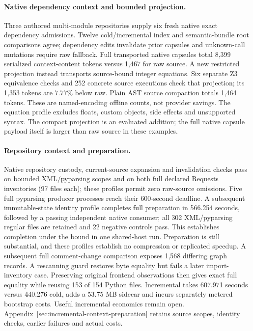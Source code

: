 \paragraph{Native dependency context and bounded projection.}
Three authored multi-module repositories supply six fresh native exact
dependency admissions. Twelve cold/incremental index and semantic-bundle root
comparisons agree; dependency edits invalidate prior capsules and unknown-call
mutations require raw fallback. Full transported native capsules total
8,399 serialized context-content
tokens versus 1,467 for raw source. A new restricted projection instead
transports source-bound integer equations. Six separate Z3 equivalence checks
and 252 concrete source executions check that projection; its 1,353
tokens are 7.77\% below raw. Plain AST source compaction totals
1,464 tokens. These are named-encoding offline counts, not provider savings.
The equation profile excludes floats, custom objects, side effects and unsupported
syntax. The compact projection is an evaluated addition; the full native capsule
payload itself is larger than raw source in these examples.

\paragraph{Repository context and preparation.}
Native repository custody, current-source expansion and invalidation checks
pass on bounded XML/pyparsing scopes and on both full declared Requests
inventories (97 files each); these profiles permit zero raw-source omissions.
Five full pyparsing producer processes reach their 600-second deadline. A
subsequent immutable-state identity profile completes full preparation in
566.254 seconds, followed by a passing independent native consumer; all
302 XML/pyparsing regular files are retained and 22 negative controls pass.
This establishes completion under the bound in one shared-host run. Preparation
is still substantial, and these profiles establish no compression or replicated
speedup. A subsequent full comment-change comparison exposes 1,568 differing
graph records. A rescanning guard restores byte equality but fails a later
import-inventory case. Preserving original frontend observations then gives
exact full equality while reusing 153 of 154 Python files. Incremental takes
607.971 seconds versus 440.276 cold, adds a 53.75 MB sidecar and incurs separately
metered bootstrap costs. Useful incremental economics remain open.
Appendix~\ref{sec:incremental-context-preparation} retains source scopes,
identity checks, earlier failures and actual costs.

